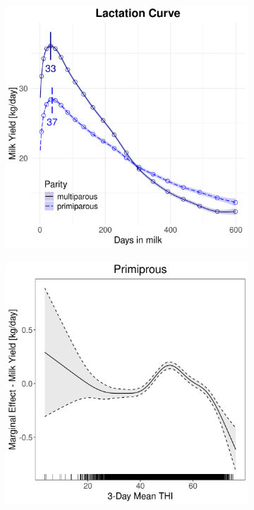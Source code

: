 \begin{figure}[H]
\begin{subfigure}[b]{0.45\textwidth}
        \includegraphics[width=\textwidth]{thesis/figures/models/milk/after2010/ho_milk_after2010/ho_milk_after2010_marginal_dim_milk_combined.png}
    \end{subfigure}
    \begin{subfigure}[b]{0.45\textwidth}
        \centering
        \includegraphics[width=\textwidth]{thesis/figures/models/milk/after2010/ho_milk_after2010/ho_milk_after2010_marginal_thi_milk_primi.png}

\end{subfigure}
\end{figure}
